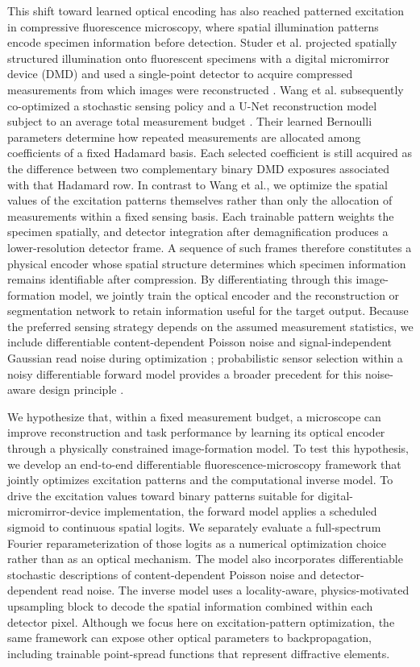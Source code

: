 \documentclass{optica-article}
\begin{document}
This shift toward learned optical encoding has also reached patterned excitation in compressive fluorescence microscopy, where spatial illumination patterns encode specimen information before detection. Studer et al. projected spatially structured illumination onto fluorescent specimens with a digital micromirror device (DMD) and used a single-point detector to acquire compressed measurements from which images were reconstructed \cite{studer2012compressive}. Wang et al. subsequently co-optimized a stochastic sensing policy and a U-Net reconstruction model subject to an average total measurement budget \cite{wang2021joint}. Their learned Bernoulli parameters determine how repeated measurements are allocated among coefficients of a fixed Hadamard basis. Each selected coefficient is still acquired as the difference between two complementary binary DMD exposures associated with that Hadamard row. In contrast to Wang et al., we optimize the spatial values of the excitation patterns themselves rather than only the allocation of measurements within a fixed sensing basis. Each trainable pattern weights the specimen spatially, and detector integration after demagnification produces a lower-resolution detector frame. A sequence of such frames therefore constitutes a physical encoder whose spatial structure determines which specimen information remains identifiable after compression. By differentiating through this image-formation model, we jointly train the optical encoder and the reconstruction or segmentation network to retain information useful for the target output. Because the preferred sensing strategy depends on the assumed measurement statistics, we include differentiable content-dependent Poisson noise and signal-independent Gaussian read noise during optimization \cite{wang2021joint}; probabilistic sensor selection within a noisy differentiable forward model provides a broader precedent for this noise-aware design principle \cite{sun2020learning}.

We hypothesize that, within a fixed measurement budget, a microscope can improve reconstruction and task performance by learning its optical encoder through a physically constrained image-formation model. To test this hypothesis, we develop an end-to-end differentiable fluorescence-microscopy framework that jointly optimizes excitation patterns and the computational inverse model. To drive the excitation values toward binary patterns suitable for digital-micromirror-device implementation, the forward model applies a scheduled sigmoid to continuous spatial logits. We separately evaluate a full-spectrum Fourier reparameterization of those logits as a numerical optimization choice rather than as an optical mechanism. The model also incorporates differentiable stochastic descriptions of content-dependent Poisson noise and detector-dependent read noise. The inverse model uses a locality-aware, physics-motivated upsampling block to decode the spatial information combined within each detector pixel. Although we focus here on excitation-pattern optimization, the same framework can expose other optical parameters to backpropagation, including trainable point-spread functions that represent diffractive elements.
\end{document}
